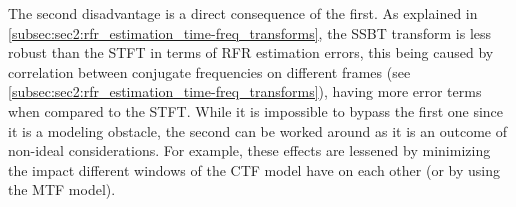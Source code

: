 The second disadvantage is a direct consequence of the first. As explained in \cref{subsec:sec2:rfr_estimation_time-freq_transforms}, the SSBT transform is less robust than the STFT in terms of RFR estimation errors, this being caused by correlation between conjugate frequencies on different frames (see \cref{subsec:sec2:rfr_estimation_time-freq_transforms}), having more error terms when compared to the STFT.
While it is impossible to bypass the first one since it is a modeling obstacle, the second can be worked around as it is an outcome of non-ideal considerations. For example, these effects are lessened by minimizing the impact different windows of the CTF model have on each other (or by using the MTF model).